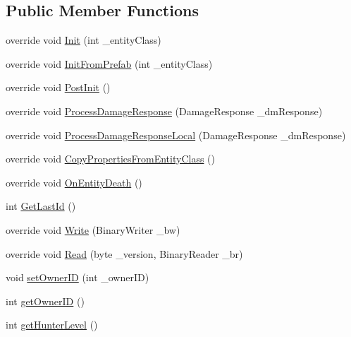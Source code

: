 \subsection*{Public Member Functions}
\begin{DoxyCompactItemize}
\item 
override void \mbox{\hyperlink{class_entity_zombie_flying_s_d_x_a0e36bda6c13fed88c6d296455ed665b6}{Init}} (int \+\_\+entity\+Class)
\item 
override void \mbox{\hyperlink{class_entity_zombie_flying_s_d_x_a0f99067e6f609d4aa155de8219633124}{Init\+From\+Prefab}} (int \+\_\+entity\+Class)
\item 
override void \mbox{\hyperlink{class_entity_zombie_flying_s_d_x_a7b913eb34126bf74120ce2f575e15de0}{Post\+Init}} ()
\item 
override void \mbox{\hyperlink{class_entity_zombie_flying_s_d_x_ab11877193ed6025765e36bda39b0918a}{Process\+Damage\+Response}} (Damage\+Response \+\_\+dm\+Response)
\item 
override void \mbox{\hyperlink{class_entity_zombie_flying_s_d_x_ab3e11a97fc12b099a0ceb479f17da7c7}{Process\+Damage\+Response\+Local}} (Damage\+Response \+\_\+dm\+Response)
\item 
override void \mbox{\hyperlink{class_entity_zombie_flying_s_d_x_a07997e0b0c2f2e7552bbaab8e213cbc3}{Copy\+Properties\+From\+Entity\+Class}} ()
\item 
override void \mbox{\hyperlink{class_entity_zombie_flying_s_d_x_aad353bdf66779433ef8dbb285cc893c7}{On\+Entity\+Death}} ()
\item 
int \mbox{\hyperlink{class_entity_zombie_flying_s_d_x_a92f4b99e9b7366a229190910ed73837d}{Get\+Last\+Id}} ()
\item 
override void \mbox{\hyperlink{class_entity_zombie_flying_s_d_x_a7b74c55dec307fe3acb6ca0643cd70fe}{Write}} (Binary\+Writer \+\_\+bw)
\item 
override void \mbox{\hyperlink{class_entity_zombie_flying_s_d_x_a5af6bcdb5f8f464bce03a09d9ae0b1ce}{Read}} (byte \+\_\+version, Binary\+Reader \+\_\+br)
\item 
void \mbox{\hyperlink{class_entity_zombie_flying_s_d_x_acdfec9186465aef955f58962e0763655}{set\+Owner\+ID}} (int \+\_\+owner\+ID)
\item 
int \mbox{\hyperlink{class_entity_zombie_flying_s_d_x_a646ef36c07bb0e9139c111deaf0ea0e7}{get\+Owner\+ID}} ()
\item 
int \mbox{\hyperlink{class_entity_zombie_flying_s_d_x_ad26e497d00cc42de478bdbaaec5c6c70}{get\+Hunter\+Level}} ()

\end{DoxyCompactItemize}
